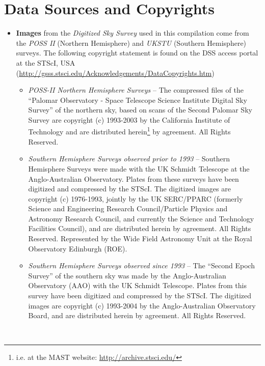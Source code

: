 \section{Data Sources and Copyrights}
\begin{itemize}
\item \textbf{Images} from the \emph{Digitized Sky Survey} used in
  this compilation come from the \emph{POSS II} (Northern Hemisphere)
  and \emph{UKSTU} (Southern Hemisphere) surveys. The following
  copyright statement is found on the DSS access portal at the STScI,
  USA
  (\url{http://gsss.stsci.edu/Acknowledgements/DataCopyrights.htm})

  \begin{itemize}
    \item \emph{POSS-II Northern Hemisphere Surveys} -- The compressed
      files of the ``Palomar Observatory - Space Telescope Science
      Institute Digital Sky Survey'' of the northern sky, based on
      scans of the Second Palomar Sky Survey are copyright (c)
      1993-2003 by the California Institute of Technology and are
      distributed herein\footnote{i.e. at the MAST website:
        \url{http://archive.stsci.edu/}} by agreement. All Rights
      Reserved.
    \item \emph{Southern Hemisphere Surveys observed prior to 1993} --
      Southern Hemisphere Surveys were made with the UK Schmidt
      Telescope at the Anglo-Australian Observatory. Plates from these
      surveys have been digitized and compressed by the STScI. The
      digitized images are copyright (c) 1976-1993, jointly by the UK
      SERC/PPARC (formerly Science and Engineering Research
      Council/Particle Physics and Astronomy Research Council, and
      currently the Science and Technology Facilities Council), and
      are distributed herein by agreement. All Rights
      Reserved. Represented by the Wide Field Astronomy Unit at the
      Royal Observatory Edinburgh (ROE).
    \item \emph{Southern Hemisphere Surveys observed since 1993} --
      The ``Second Epoch Survey'' of the southern sky was made by the
      Anglo-Australian Observatory (AAO) with the UK Schmidt
      Telescope. Plates from this survey have been digitized and
      compressed by the STScI. The digitized images are copyright (c)
      1993-2004 by the Anglo-Australian Observatory Board, and are
      distributed herein by agreement. All Rights Reserved.
  \end{itemize}

  \\


\end{itemize}
